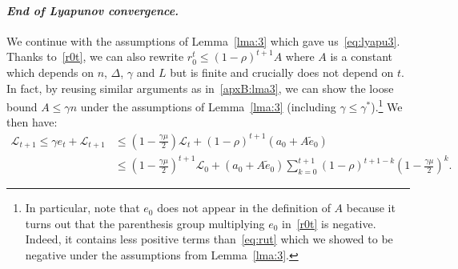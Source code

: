 \documentclass[twoside, 11pt]{article}
\newcommand{\stepsize}{\gamma}
\newcommand{\strongconvex}{\mu}
\newcommand{\contraction}{\rho}
\newcommand{\sparsity}{\Delta}
\newcommand{\lipschitz}{L}
\newcommand{\lyapunov}{\mathcal{L}}
\begin{document}
\paragraph{\textit{End of Lyapunov convergence.}}
We continue with the assumptions of Lemma~\ref{lma:3} which gave us~\eqref{eq:lyapu3}.
Thanks to~\eqref{r0t}, we can also rewrite $r_0^t \leq (1 -\contraction)^{t+1} A$ where $A$ is a constant which depends on $n$, $\sparsity$, $\stepsize$ and $\lipschitz$ but is finite and crucially does not depend on $t$.
In fact, by reusing similar arguments as in~\ref{apxB:lma3}, we can show the loose bound $A \leq \stepsize n$ under the assumptions of Lemma~\ref{lma:3} (including $\stepsize \leq \stepsize^*$).\footnote{In particular, note that $e_0$ does not appear in the definition of $A$ because it turns out that the parenthesis group multiplying $e_0$ in~\eqref{r0t} is negative. Indeed, it contains less positive terms than~\eqref{eq:rut} which we showed to be negative under the assumptions from Lemma~\ref{lma:3}.}
We then have:
\begin{align}
\lyapunov_{t+1}  \leq \stepsize e_t + \lyapunov_{t+1}
&\leq (1-\frac{\stepsize\strongconvex}{2})\lyapunov_t  +(1 - \contraction)^{t+1} (a_0 + A \tilde e_0)
\nonumber \\
&\leq (1-\frac{\stepsize\strongconvex}{2})^{t+1}\lyapunov_0 + (a_0 + A \tilde e_0) \sum_{k=0}^{t+1} (1 - \contraction)^{t+1 -k} (1-\frac{\stepsize\strongconvex}{2})^k .
\end{align}
\end{document}
